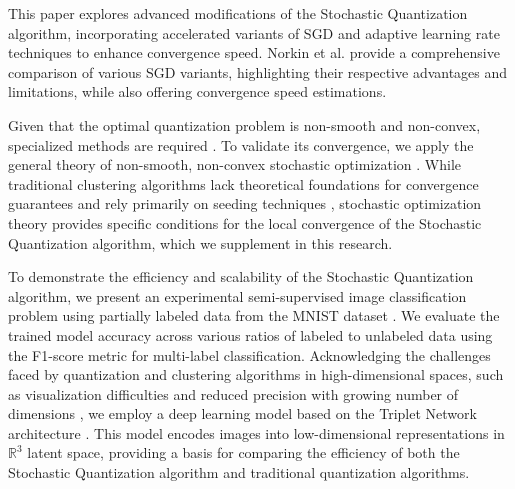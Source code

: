 This paper explores advanced modifications of the Stochastic Quantization algorithm, incorporating accelerated variants of SGD \cite{Poliak_1987,nesterov1983method,walkington_2023} and adaptive learning rate techniques \cite{Duchi_Hazan_Singer_2011,tieleman2012rmsprop,kingma2017adam} to enhance convergence speed. Norkin et al. \cite{Norkin_Kozyriev_Norkin_2024} provide a comprehensive comparison of various SGD variants, highlighting their respective advantages and limitations, while also offering convergence speed estimations.

Given that the optimal quantization problem is non-smooth and non-convex, specialized methods are required \cite{Tang_2017,Zhao_Lan_Chen_Ngo_2021,Gandikota_Kane_Maity_Mazumdar_2022}. To validate its convergence, we apply the general theory of non-smooth, non-convex stochastic optimization \cite{mikhalevich2024,Ermolev_Norkin_1998,Ermoliev_Norkin_2003}. While traditional clustering algorithms lack theoretical foundations for convergence guarantees and rely primarily on seeding techniques \cite{Arthur_Vassilvitskii_2007}, stochastic optimization theory provides specific conditions for the local convergence of the Stochastic Quantization algorithm, which we supplement in this research.

To demonstrate the efficiency and scalability of the Stochastic Quantization algorithm, we present an experimental semi-supervised image classification problem using partially labeled data from the MNIST dataset \cite{lecun2010mnist}. We evaluate the trained model accuracy across various ratios of labeled to unlabeled data using the F1-score metric \cite{Chinchor_1992} for multi-label classification. Acknowledging the challenges faced by quantization and clustering algorithms in high-dimensional spaces, such as visualization difficulties and reduced precision with growing number of dimensions \cite{Kriegel_Kröger_Zimek_2009}, we employ a deep learning model based on the Triplet Network architecture \cite{Hoffer_2015}. This model encodes images into low-dimensional representations in $\mathbb{R}^3$ latent space, providing a basis for comparing the efficiency of both the Stochastic Quantization algorithm and traditional quantization algorithms.
